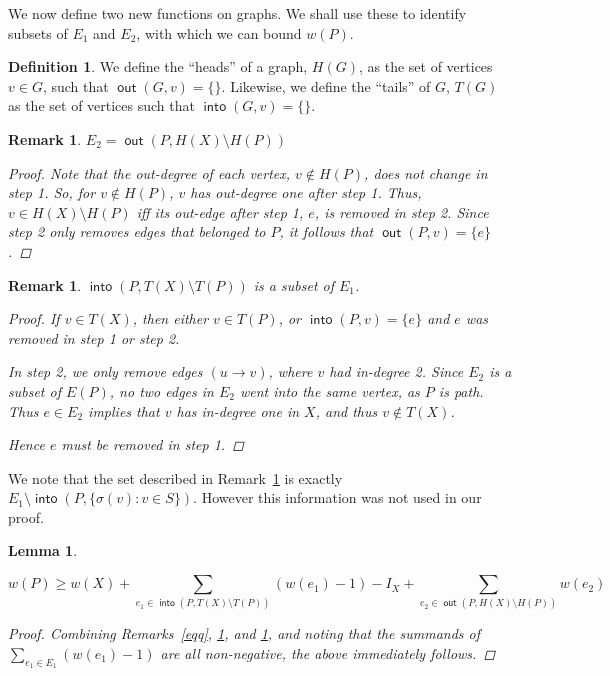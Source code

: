 \documentclass{article}
\newtheorem{lem}[result]{Lemma}
\newtheorem{rmk}[result]{Remark}
\theoremstyle{definition}
\newtheorem*{defn}{Definition}
\DeclareMathOperator{\out}{\bm{\mathsf{out}}}
\DeclareMathOperator{\into}{\bm{\mathsf{into}}}
\begin{document}
\vspace{1.75em}

We now define two new functions on graphs. We shall use these to identify subsets of $E_1$ and $E_2$, with which we can bound $w(P)$. 

\begin{defn} We define the ``heads'' of a graph, $H(G)$, as the set of vertices $v \in G$, such that $\out(G,v) = \{\}$. Likewise, we define the ``tails'' of $G$, $T(G)$ as the set of vertices such that $\into(G,v) = \{\}$.\end{defn}

\begin{rmk}\label{e2} $E_2 = \out(P,H(X)\setminus H(P))$
\begin{proof}
Note that the out-degree of each vertex, $v\not\in H(P)$, does not change in step 1. So, for $v \not \in H(P)$, $v$ has out-degree one after step 1. Thus, $v \in H(X)\setminus H(P)$ iff its out-edge after step 1, $e$, is removed in step 2. Since step 2 only removes edges that belonged to $P$, it follows that $\out(P,v) = \{e\}$.
\end{proof}


\end{rmk}

\begin{rmk}\label{e1} $\into(P,T(X)\setminus T(P))$ is a subset of $E_1$.
\begin{proof}
If $v \in T(X)$, then either $v \in T(P)$, or $\into(P,v)=\{e\}$ and $e$ was removed in step 1 or step 2.

In step 2, we only remove edges $(u\to v)$, where $v$ had in-degree 2. Since $E_2$ is a subset of $E(P)$, no two edges in $E_2$ went into the same vertex, as $P$ is path. Thus $e \in E_2$ implies that $v$ has in-degree one in $X$, and thus $v \not \in T(X)$.

Hence $e$ must be removed in step 1.
\end{proof}
\end{rmk}
\noindent We note that the set described in Remark~\ref{e1} is exactly $E_1 \setminus \into(P,\{ \sigma(v): v \in S\})$. However this information was not used in our proof.

\vspace{1.75em}


\begin{lem} \label{weight rule} 

\[w(P) \geq w(X) + \sum_{e_1 \in \into(P,T(X)\setminus T(P))} (w(e_1)-1) -I_X + \sum_{e_2 \in \out(P,H(X)\setminus H(P))} w(e_2)\] 
\begin{proof}
Combining Remarks~\ref{eqq}, \ref{e2}, and \ref{e1}, and noting that the summands of \linebreak $\sum_{e_1\in E_1} (w(e_1)-1)$ are all non-negative, the above immediately follows.
\end{proof}

\end{lem}
\end{document}
